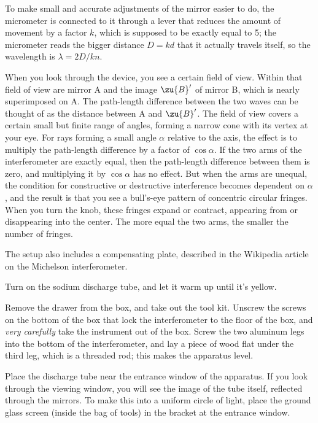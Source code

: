 \apparatus

To make small and accurate adjustments
of the mirror easier to do, the micrometer is connected to it through a lever that
reduces the amount of movement by a factor $k$, which is supposed to be exactly equal to 5; the micrometer reads the
bigger distance $D=kd$ that it actually travels itself, so the wavelength is
$\lambda=2D/kn$.

When you look through the device, you see a certain field of view. Within that
field of view are mirror A and the image $\zu{B}'$ of mirror B, which is nearly superimposed on A.
The path-length difference between the two waves can be thought of as the distance between
A and $\zu{B}'$.
The field of view covers a certain small but finite range of angles, forming
a narrow cone with its vertex at your eye. For rays forming a small angle
$\alpha$ relative to the axis, the effect is to multiply the path-length difference
by a factor of $\cos\alpha$. If the two arms of the interferometer are exactly
equal, then the path-length difference between them is zero, and multiplying it
by $\cos\alpha$ has no effect. But when the arms are unequal, the condition for
constructive or destructive interference becomes dependent on $\alpha$, and the
result is that you see a bull's-eye pattern of concentric circular fringes.
When you turn the knob, these fringes expand or contract, appearing from or disappearing
into the center. The more equal the two arms, the smaller the number of fringes.

The setup also includes a compensating plate, described in the Wikipedia article on
the Michelson interferometer.

\setup

Turn on the sodium discharge tube, and let it warm up until it's yellow.

Remove the drawer from the box, and take out the tool kit. Unscrew the screws
on the bottom of the box that lock the interferometer to the floor of the box,
and \emph{very carefully} take the instrument out of the box. Screw the two
aluminum legs into the bottom of the interferometer, and lay a piece of
wood flat under the third leg, which is a threaded rod; this makes the apparatus
level.

Place the discharge tube near the entrance window of the apparatus. If you look
through the viewing window, you will see the image of the tube itself, reflected
through the mirrors. To make this into a uniform circle of light, place the
ground glass screen (inside the bag of tools) in the bracket at the entrance
window.

